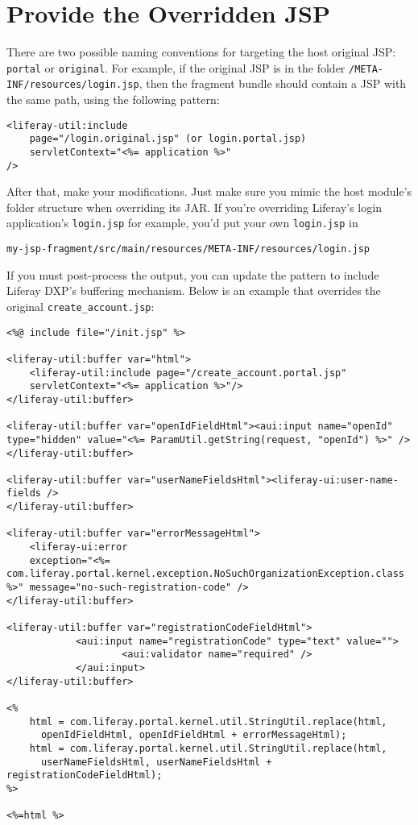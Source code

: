 \section{Provide the Overridden JSP}\label{provide-the-overridden-jsp}

There are two possible naming conventions for targeting the host
original JSP: \texttt{portal} or \texttt{original}. For example, if the
original JSP is in the folder \texttt{/META-INF/resources/login.jsp},
then the fragment bundle should contain a JSP with the same path, using
the following pattern:

\begin{verbatim}
<liferay-util:include 
    page="/login.original.jsp" (or login.portal.jsp) 
    servletContext="<%= application %>" 
/>
\end{verbatim}

After that, make your modifications. Just make sure you mimic the host
module's folder structure when overriding its JAR. If you're overriding
Liferay's login application's \texttt{login.jsp} for example, you'd put
your own \texttt{login.jsp} in

\begin{verbatim}
my-jsp-fragment/src/main/resources/META-INF/resources/login.jsp
\end{verbatim}

If you must post-process the output, you can update the pattern to
include Liferay DXP's buffering mechanism. Below is an example that
overrides the original \texttt{create\_account.jsp}:

\begin{verbatim}
<%@ include file="/init.jsp" %>

<liferay-util:buffer var="html">
    <liferay-util:include page="/create_account.portal.jsp" 
    servletContext="<%= application %>"/>
</liferay-util:buffer>

<liferay-util:buffer var="openIdFieldHtml"><aui:input name="openId" 
type="hidden" value="<%= ParamUtil.getString(request, "openId") %>" />
</liferay-util:buffer>

<liferay-util:buffer var="userNameFieldsHtml"><liferay-ui:user-name-fields />
</liferay-util:buffer>

<liferay-util:buffer var="errorMessageHtml">
    <liferay-ui:error 
    exception="<%= com.liferay.portal.kernel.exception.NoSuchOrganizationException.class %>" message="no-such-registration-code" />
</liferay-util:buffer>

<liferay-util:buffer var="registrationCodeFieldHtml">
            <aui:input name="registrationCode" type="text" value="">
                    <aui:validator name="required" />
            </aui:input>
</liferay-util:buffer>

<%
    html = com.liferay.portal.kernel.util.StringUtil.replace(html, 
      openIdFieldHtml, openIdFieldHtml + errorMessageHtml);
    html = com.liferay.portal.kernel.util.StringUtil.replace(html, 
      userNameFieldsHtml, userNameFieldsHtml + registrationCodeFieldHtml);
%>

<%=html %>
\end{verbatim}

